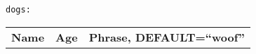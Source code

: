 \begin{center}
    \texttt{dogs:}
    \begin{tabular}{l l l}
        \textbf{Name} & \textbf{Age} & \textbf{Phrase, DEFAULT=``woof''}
    \end{tabular}
\end{center}

